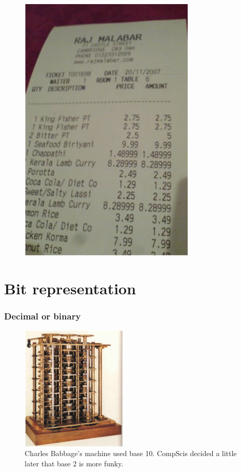 \documentclass[notes]{beamer}
\begin{document}
\begin{frame}
\begin{minipage}[t]{0.45\linewidth}
\begin{figure}[ht]
		\includegraphics[width=0.75\textwidth]{figs/bill.png}
	\end{figure}
	\end{minipage}
\end{frame}

\section{Bit representation}
\begin{frame}
	\frametitle{Decimal or binary}
	\begin{figure}[ht]
		\centering
		\includegraphics[width=0.45\textwidth]{figs/babbage.png}
		\caption*{Charles Babbage’s machine used base 10. CompScis decided a little later
			that base 2 is more funky.}
	\end{figure}
\end{frame}
\end{document}
